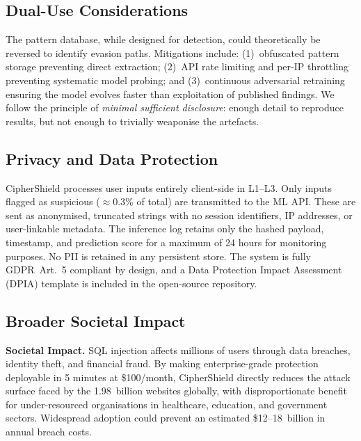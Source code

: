 \documentclass[10pt,twocolumn]{article}
\begin{document}
\subsection{Dual-Use Considerations}

The pattern database, while designed for detection, could theoretically
be reversed to identify evasion paths. Mitigations include:
(1)~obfuscated pattern storage preventing direct extraction;
(2)~API rate limiting and per-IP throttling preventing systematic
model probing; and (3)~continuous adversarial retraining ensuring
the model evolves faster than exploitation of published findings.
We follow the principle of \emph{minimal sufficient disclosure}:
enough detail to reproduce results, but not enough to trivially
weaponise the artefacts.

\subsection{Privacy and Data Protection}

CipherShield processes user inputs entirely client-side in L1--L3.
Only inputs flagged as suspicious ($\approx$0.3\% of total) are
transmitted to the ML API. These are sent as anonymised, truncated
strings with no session identifiers, IP addresses, or user-linkable
metadata. The inference log retains only the hashed payload, timestamp,
and prediction score for a maximum of 24 hours for monitoring purposes.
No PII is retained in any persistent store. The system is fully
GDPR~Art.~5 compliant by design, and a Data Protection Impact
Assessment (DPIA) template is included in the open-source repository.

\subsection{Broader Societal Impact}

\begin{calloutbox}
{\small\textbf{Societal Impact.}
SQL injection affects millions of users through data breaches, identity
theft, and financial fraud. By making enterprise-grade protection
deployable in 5 minutes at \$100/month, CipherShield directly reduces
the attack surface faced by the 1.98~billion websites globally,
with disproportionate benefit for under-resourced organisations in
healthcare, education, and government sectors. Widespread adoption
could prevent an estimated \$12--18~billion in annual breach costs.}
\end{calloutbox}
\end{document}
